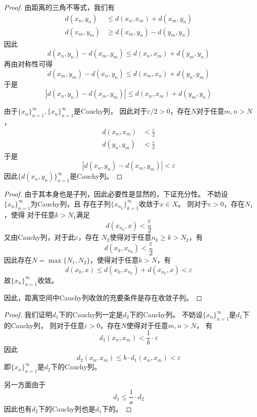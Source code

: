 \documentclass[cn]{homework}
\begin{document}
    \problem

    \problem
    \begin{proof}
        由距离的三角不等式，我们有
        \begin{align*}
            d(x_n,y_n)&\leq d(x_n,x_m)+d(x_m,y_n)\\
            d(x_m,y_m)&\geq d(x_m,y_n)-d(y_m,y_n)
        \end{align*}
        因此
        \[d(x_n,y_n)-d(x_m,y_m)\leq d(x_n,x_m)+d(y_m,y_n)\]
        再由对称性可得
        \[d(x_m,y_m)-d(x_n,y_n)\leq d(x_m,x_n)+d(y_n,y_m)\]
        于是
        \[|d(x_n,y_n)-d(x_m,y_m)|\leq d(x_n,x_m)+d(y_m,y_n)\]
        
        由于$\{x_n\}_{n=1}^\infty,\{x_n\}_{n=1}^\infty$是Cauchy列，
        因此对于$\varepsilon/2>0$，存在$N$对于任意$m,n>N$，
        \begin{align*}
            d(x_n,x_m)&<\frac{\varepsilon}{2}\\
            d(y_n,y_m)&<\frac{\varepsilon}{2}
        \end{align*}
        于是
        \[|d(x_n,y_n)-d(x_m,y_m)|<\varepsilon\]
        因此$\{d(x_n,y_n)\}_{n=1}^\infty$是Cauchy列。
    \end{proof}

    \problem
    \begin{proof}
        由于其本身也是子列，因此必要性是显然的，下证充分性。
        不妨设$\{x_n\}_{n=1}^\infty$为Cauchy列，且
        存在子列$\{x_{n_k}\}_{k=1}^\infty$收敛于$x\in X$。
        则对于$\varepsilon>0$，存在$N_1$，使得
        对于任意$k>N_1$满足
        \[d(x_{n_k},x)<\frac{\varepsilon}{2}\]
        又由Cauchy列，对于此$\varepsilon$，存在
        $N_2$使得对于任意$n_k\geq k>N_2$，有
        \[d(x_k,x_{n_k})<\frac{\varepsilon}{2}\]
        因此存在$N=\max\{N_1,N_2\}$，使得对于任意$k>N$，有
        \[d(x_k,x)\leq d(x_k,x_{n_k})+d(x_{n_k},x)<\varepsilon\]
        故$\{x_n\}_{n=1}^\infty$收敛。

        因此，距离空间中Cauchy列收敛的充要条件是存在收敛子列。
    \end{proof}

    \problem
    \begin{proof}
        我们证明$d_1$下的Cauchy列一定是$d_2$下的Cauchy列。
        不妨设$\{x_n\}_{n=1}^\infty$是$d_1$下的Cauchy列，
        则对于任意$\varepsilon>0$，存在$N$使得对于任意$m,n>N$，
        有
        \[d_1(x_n,x_m)<\frac{1}{b}\cdot\varepsilon\]
        因此
        \[d_2(x_n,x_m)\leq b\cdot d_1(x_n,x_m)<\varepsilon\]
        即$\{x_n\}_{n=1}^\infty$是$d_2$下的Cauchy列。

        另一方面由于
        \[d_1\leq\frac{1}{a}\cdot d_2\]
        因此也有$d_2$下的Cauchy列也是$d_1$下的。
    \end{proof}
\end{document}
